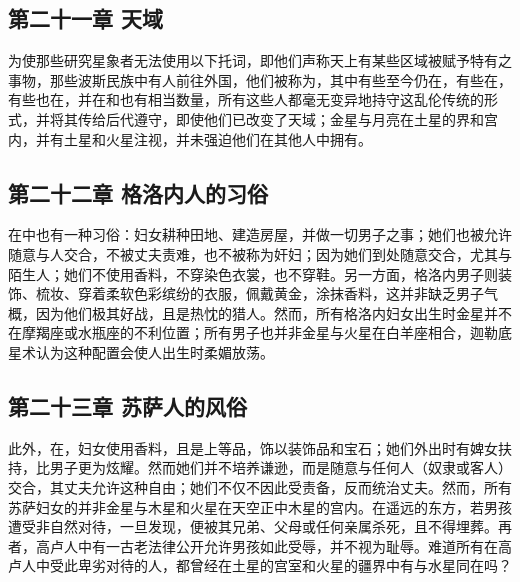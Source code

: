 
\subsection{第二十一章 天域}

为使那些研究星象者无法使用以下托词，即他们声称天上有某些区域被赋予特有之事物，那些波斯民族中有人前往外国，他们被称为，其中有些至今仍在，有些在，有些也在，并在和也有相当数量，所有这些人都毫无变异地持守这乱伦传统的形式，并将其传给后代遵守，即使他们已改变了天域；金星与月亮在土星的界和宫内，并有土星和火星注视，并未强迫他们在其他人中拥有。\par


\subsection{第二十二章 格洛内人的习俗}

在中也有一种习俗：妇女耕种田地、建造房屋，并做一切男子之事；她们也被允许随意与人交合，不被丈夫责难，也不被称为奸妇；因为她们到处随意交合，尤其与陌生人；她们不使用香料，不穿染色衣裳，也不穿鞋。另一方面，格洛内男子则装饰、梳妆、穿着柔软色彩缤纷的衣服，佩戴黄金，涂抹香料，这并非缺乏男子气概，因为他们极其好战，且是热忱的猎人。然而，所有格洛内妇女出生时金星并不在摩羯座或水瓶座的不利位置；所有男子也并非金星与火星在白羊座相合，迦勒底星术认为这种配置会使人出生时柔媚放荡。\par


\subsection{第二十三章 苏萨人的风俗}

此外，在，妇女使用香料，且是上等品，饰以装饰品和宝石；她们外出时有婢女扶持，比男子更为炫耀。然而她们并不培养谦逊，而是随意与任何人（奴隶或客人）交合，其丈夫允许这种自由；她们不仅不因此受责备，反而统治丈夫。然而，所有苏萨妇女的并非金星与木星和火星在天空正中木星的宫内。在遥远的东方，若男孩遭受非自然对待，一旦发现，便被其兄弟、父母或任何亲属杀死，且不得埋葬。再者，高卢人中有一古老法律公开允许男孩如此受辱，并不视为耻辱。难道所有在高卢人中受此卑劣对待的人，都曾经在土星的宫室和火星的疆界中有与水星同在吗？\par

